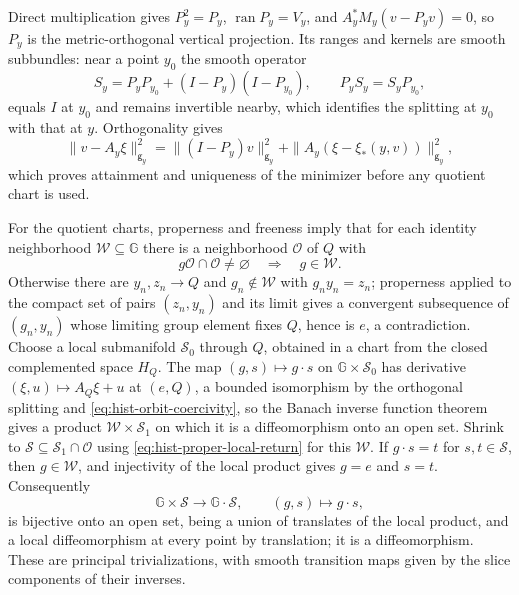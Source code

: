 Direct multiplication gives \(P_y^2=P_y\), \(\operatorname{ran}P_y=V_y\), and
\(A_y^*M_y(v-P_yv)=0\), so \(P_y\) is the metric-orthogonal vertical projection.
Its ranges and kernels are smooth subbundles: near a point \(y_0\) the smooth
operator
\begin{equation}
S_y=P_yP_{y_0}+(I-P_y)(I-P_{y_0}),
\qquad
P_yS_y=S_yP_{y_0},
\label{eq:hist-projection-trivialization}
\end{equation}
equals \(I\) at \(y_0\) and remains invertible nearby, which identifies the
splitting at \(y_0\) with that at \(y\). Orthogonality gives
\begin{equation}
\|v-A_y\xi\|_{\mathsf g_y}^2
=\|(I-P_y)v\|_{\mathsf g_y}^2
+\|A_y(\xi-\xi_*(y,v))\|_{\mathsf g_y}^2,
\label{eq:hist-quotient-pythagoras}
\end{equation}
which proves attainment and uniqueness of the minimizer before any quotient
chart is used.

For the quotient charts, properness and freeness imply that for each identity
neighborhood \(\mathcal W\subseteq\mathbb G\) there is a neighborhood
\(\mathcal O\) of \(Q\) with
\begin{equation}
g\mathcal O\cap\mathcal O\ne\varnothing\quad\Longrightarrow\quad g\in\mathcal W.
\label{eq:hist-proper-local-return}
\end{equation}
Otherwise there are \(y_n,z_n\to Q\) and \(g_n\notin\mathcal W\) with
\(g_ny_n=z_n\); properness applied to the compact set of pairs \((z_n,y_n)\) and
its limit gives a convergent subsequence of \((g_n,y_n)\) whose limiting group
element fixes \(Q\), hence is \(e\), a contradiction. Choose a local submanifold
\(\mathcal S_0\) through \(Q\), obtained in a chart from the closed complemented
space \(H_Q\). The map \((g,s)\mapsto g\cdot s\) on \(\mathbb G\times\mathcal S_0\)
has derivative \((\xi,u)\mapsto A_Q\xi+u\) at \((e,Q)\), a bounded isomorphism by
the orthogonal splitting and \eqref{eq:hist-orbit-coercivity}, so the Banach
inverse function theorem gives a product \(\mathcal W\times\mathcal S_1\) on which
it is a diffeomorphism onto an open set. Shrink to
\(\mathcal S\subseteq\mathcal S_1\cap\mathcal O\) using
\eqref{eq:hist-proper-local-return} for this \(\mathcal W\). If \(g\cdot s=t\) for
\(s,t\in\mathcal S\), then \(g\in\mathcal W\), and injectivity of the local product
gives \(g=e\) and \(s=t\). Consequently
\begin{equation}
\mathbb G\times\mathcal S\longrightarrow\mathbb G\cdot\mathcal S,
\qquad
(g,s)\longmapsto g\cdot s,
\label{eq:hist-principal-slice}
\end{equation}
is bijective onto an open set, being a union of translates of the local product,
and a local diffeomorphism at every point by translation; it is a
diffeomorphism. These are principal trivializations, with smooth transition maps
given by the slice components of their inverses.

